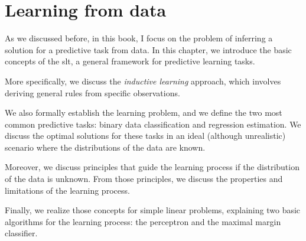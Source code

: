 \chapter{Learning from data}
\label{chap:slt}
\glsresetall


As we discussed before, in this book, I focus on the problem of inferring a solution for a
predictive task from data.  In this chapter, we introduce the basic concepts of the
\gls{slt}, a general framework for predictive learning tasks.

More specifically, we discuss the \emph{inductive learning} approach, which involves
deriving general rules from specific observations.

We also formally establish the learning problem, and we define the two most common
predictive tasks: binary data classification and regression estimation.  We discuss the
optimal solutions for these tasks in an ideal (although unrealistic) scenario where the
distributions of the data are known.

Moreover, we discuss principles that guide the learning process if the distribution of
the data is unknown.  From those principles, we discuss the properties and limitations of
the learning process.

Finally, we realize those concepts for simple linear problems, explaining two basic
algorithms for the learning process: the perceptron and the maximal margin classifier.

